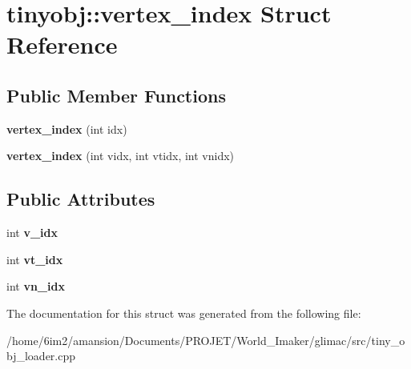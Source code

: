 \hypertarget{structtinyobj_1_1vertex__index}{}\section{tinyobj\+:\+:vertex\+\_\+index Struct Reference}
\label{structtinyobj_1_1vertex__index}
\subsection*{Public Member Functions}
\begin{DoxyCompactItemize}
\item 
\mbox{\label{structtinyobj_1_1vertex__index_a894075fa64d32082219c138f111e4753}} 
{\bfseries vertex\+\_\+index} (int idx)
\item 
\mbox{\label{structtinyobj_1_1vertex__index_aa3c4d6bcba36c2abb06e25497a1376a1}} 
{\bfseries vertex\+\_\+index} (int vidx, int vtidx, int vnidx)
\end{DoxyCompactItemize}
\subsection*{Public Attributes}
\begin{DoxyCompactItemize}
\item 
\mbox{\label{structtinyobj_1_1vertex__index_a91a2616fb97e0da915a40654edf9b558}} 
int {\bfseries v\+\_\+idx}
\item 
\mbox{\label{structtinyobj_1_1vertex__index_aae7e058d3aa0993aa05e95d82dd6b8bf}} 
int {\bfseries vt\+\_\+idx}
\item 
\mbox{\label{structtinyobj_1_1vertex__index_a30f2a63a5ed20cc3ad64e340c4020da8}} 
int {\bfseries vn\+\_\+idx}
\end{DoxyCompactItemize}


The documentation for this struct was generated from the following file\+:\begin{DoxyCompactItemize}
\item 
/home/6im2/amansion/\+Documents/\+P\+R\+O\+J\+E\+T/\+World\+\_\+\+Imaker/glimac/src/tiny\+\_\+obj\+\_\+loader.\+cpp\end{DoxyCompactItemize}
